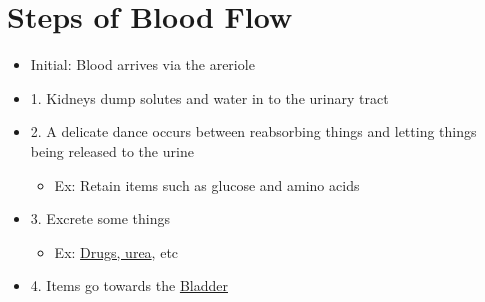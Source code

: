 \documentclass{report}
\begin{document}
\section{Steps of Blood Flow}
\begin{itemize}
  \item Initial: Blood arrives via the areriole \item 1. Kidneys dump solutes and water in to the urinary tract
  \item 2. A delicate dance occurs between reabsorbing things and letting things being released to the urine
    \begin{itemize}
      \item Ex: Retain items such as glucose and amino acids
    \end{itemize}
  \item 3. Excrete some things
    \begin{itemize}
      \item Ex: \underline{Drugs, urea}, etc
    \end{itemize}
  \item 4. Items go towards the \underline{Bladder}
\end{itemize}
\end{document}
